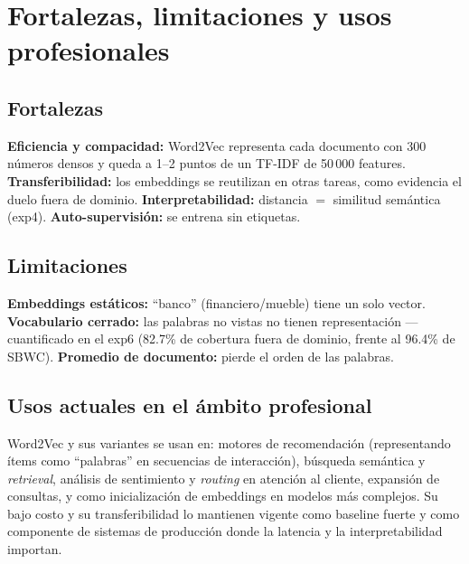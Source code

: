 \documentclass[11pt]{article}
\begin{document}
\section{Fortalezas, limitaciones y usos profesionales}

\subsection{Fortalezas}
\textbf{Eficiencia y compacidad:} Word2Vec representa cada documento con 300 números densos y
queda a 1--2 puntos de un TF-IDF de 50\,000 features. \textbf{Transferibilidad:} los
embeddings se reutilizan en otras tareas, como evidencia el duelo fuera de dominio.
\textbf{Interpretabilidad:} distancia $=$ similitud semántica (exp4). \textbf{Auto-supervisión:}
se entrena sin etiquetas.

\subsection{Limitaciones}
\textbf{Embeddings estáticos:} ``banco'' (financiero/mueble) tiene un solo vector.
\textbf{Vocabulario cerrado:} las palabras no vistas no tienen representación --- cuantificado
en el exp6 (82.7\% de cobertura fuera de dominio, frente al 96.4\% de SBWC).
\textbf{Promedio de documento:} pierde el orden de las palabras.

\subsection{Usos actuales en el ámbito profesional}
Word2Vec y sus variantes se usan en: motores de recomendación (representando ítems como
``palabras'' en secuencias de interacción), búsqueda semántica y \emph{retrieval}, análisis
de sentimiento y \emph{routing} en atención al cliente, expansión de consultas, y como
inicialización de embeddings en modelos más complejos. Su bajo costo y su transferibilidad lo
mantienen vigente como baseline fuerte y como componente de sistemas de producción donde la
latencia y la interpretabilidad importan.

\end{document}
